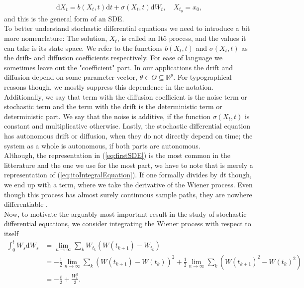 \begin{align}
    \mathrm{d}X_t = b(X_t, t)\mathrm{d}t + \sigma(X_t, t)\mathrm{d}W_t, \quad X_{t_0} = x_0 \label{eq:firstSDE},
\end{align}
and this is the general form of an SDE. \\
To better understand stochastic differential equations we need to introduce a bit more nomenclature: The solution, $X_t$, is called an Itô process, and the values it can take is its state space. We refer to the functions $b(X_t, t)$ and $\sigma(X_t, t)$ as the drift- and diffusion coefficients respectively. For ease of language we sometimes leave out the "coefficient" part. In our applications the drift and diffusion depend on some parameter vector, $\theta\in\Theta\subseteq\mathbb{R}^p$. For typographical reasons though, we mostly suppress this dependence in the notation. Additionally, we say that term with the diffusion coefficient is the noise term or stochastic term and the term with the drift is the deterministic term or deterministic part. We say that the noise is additive, if the function $\sigma(X_t, t)$ is constant and multiplicative otherwise. Lastly, the stochastic differential equation has autonomous drift or diffusion, when they do not directly depend on time; the system as a whole is autonomous, if both parts are autonomous.\\
Although, the representation in (\ref{eq:firstSDE}) is the most common in the litterature and the one we use for the most part, we have to note that is merely a representation of (\ref{eq:itoIntegralEquation}). If one formally divides by $\mathrm{d}t$ though, we end up with a term, where we take the derivative of the Wiener process. Even though this process has almost surely continuous sample paths, they are nowhere differentiable \cite[theorem 11.22 and theorem 11.35]{Hansen2022}.\\
Now, to motivate the arguably most important result in the study of stochastic differential equations, we consider integrating the Wiener process with respect to itself
\begin{align}
    \int_0^t W_s \mathrm{d}W_s & = \lim_{n \to \infty}\sum_k W_{t_k}\left(W(t_{k + 1}) - W_{t_k}\right) \nonumber \\ 
    & = - \frac{1}{2}\lim_{n \to \infty}\sum_k \left(W(t_{k + 1}) - W(t_{k})\right)^2  + \frac{1}{2}\lim_{n \to \infty}\sum_k\left(W(t_{k + 1})^2 - W(t_{k})^2\right) \nonumber \\
    & = -\frac{t}{2} + \frac{W_t^2}{2}.
\end{align}
